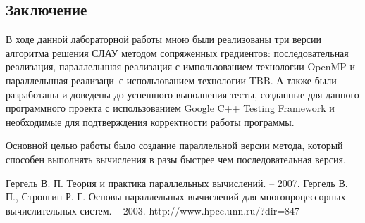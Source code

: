 \documentclass{report}
\begin{document}
\begin{center}
\section*{Заключение}
\end{center}
\par В ходе данной лабораторной работы мною были реализованы три версии алгоритма решения СЛАУ методом сопряженных градиентов: последовательная реализация, параллельнная реализация с импользованием технологии OpenMP и параллельнная реализаци\ с использованием технологии TBB. А также были разработаны и доведены до успешного выполнения тесты, созданные для данного программного проекта с использованием Google C++ Testing Framework и необходимые для подтверждения корректности работы программы.
\par Основной целью работы было создание параллельной версии метода, который способен выполнять вычисления в разы быстрее чем последовательная версия.
\newpage

\begin{thebibliography}{}
 Гергель В. П. Теория и практика параллельных вычислений. – 2007.
 Гергель В. П., Стронгин Р. Г. Основы параллельных вычислений для многопроцессорных вычислительных систем. – 2003.
http://www.hpcc.unn.ru/?dir=847


\end{thebibliography}{}
\newpage
\end{document}
